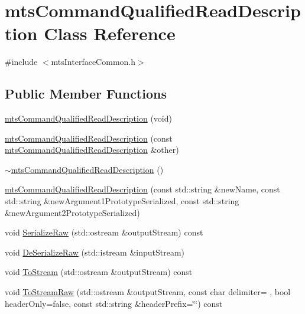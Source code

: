 \hypertarget{classmts_command_qualified_read_description}{}\section{mts\+Command\+Qualified\+Read\+Description Class Reference}
\label{classmts_command_qualified_read_description}


{\ttfamily \#include $<$mts\+Interface\+Common.\+h$>$}

\subsection*{Public Member Functions}
\begin{DoxyCompactItemize}
\item 
\hyperlink{classmts_command_qualified_read_description_ac1bbc0907aacbcba29c705be7a3d6040}{mts\+Command\+Qualified\+Read\+Description} (void)
\item 
\hyperlink{classmts_command_qualified_read_description_aa84e9217fd8e3ae9293a86a5f10e7024}{mts\+Command\+Qualified\+Read\+Description} (const \hyperlink{classmts_command_qualified_read_description}{mts\+Command\+Qualified\+Read\+Description} \&other)
\item 
\hyperlink{classmts_command_qualified_read_description_abe7e0823d8277340b167b1c621155b8e}{$\sim$mts\+Command\+Qualified\+Read\+Description} ()
\item 
\hyperlink{classmts_command_qualified_read_description_a85a636e73cab699ebbcea28f5cfc9785}{mts\+Command\+Qualified\+Read\+Description} (const std\+::string \&new\+Name, const std\+::string \&new\+Argument1\+Prototype\+Serialized, const std\+::string \&new\+Argument2\+Prototype\+Serialized)
\item 
void \hyperlink{classmts_command_qualified_read_description_a403bc9b1f46e8d1517816735827b578b}{Serialize\+Raw} (std\+::ostream \&output\+Stream) const 
\item 
void \hyperlink{classmts_command_qualified_read_description_adf580fad2322e0a485068c3c05f2d361}{De\+Serialize\+Raw} (std\+::istream \&input\+Stream)
\item 
void \hyperlink{classmts_command_qualified_read_description_a2f6c61427eefc5cd06173ddd7d751b7c}{To\+Stream} (std\+::ostream \&output\+Stream) const 
\item 
void \hyperlink{classmts_command_qualified_read_description_ab656606931b354eb29b6fc592211aca8}{To\+Stream\+Raw} (std\+::ostream \&output\+Stream, const char delimiter= \textquotesingle{} \textquotesingle{}, bool header\+Only=false, const std\+::string \&header\+Prefix=\char`\"{}\char`\"{}) const 

\end{DoxyCompactItemize}
